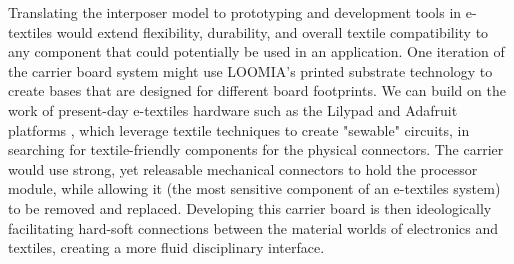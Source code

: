 Translating the interposer model to prototyping and development tools in e-textiles would extend flexibility, durability, and overall textile compatibility to any component that could potentially be used in an application. One iteration of the carrier board system might use LOOMIA's printed substrate technology to create bases that are designed for different board footprints. We can build on the work of present-day e-textiles hardware such as the Lilypad and Adafruit platforms \cite{buechley_lilypad_2008, posch_etextiles_2019, jones_wearable_2020}, which leverage textile techniques to create "sewable" circuits, in searching for textile-friendly components for the physical connectors. The carrier would use strong, yet releasable mechanical connectors to hold the processor module, while allowing it (the most sensitive component of an e-textiles system) to be removed and replaced. 
Developing this carrier board is then ideologically facilitating hard-soft connections between the material worlds of electronics and textiles, creating a more fluid disciplinary interface.



